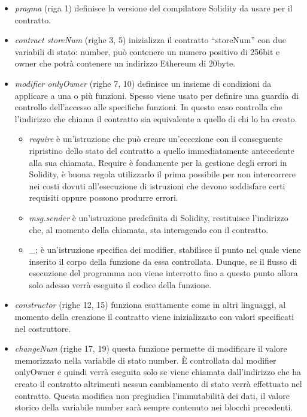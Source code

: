 \renewcommand\labelitemii{\textbullet}
\begin{itemize}
\item \emph{pragma} (riga 1) definisce la versione del compilatore Solidity da usare per il contratto.
\item \emph{contract storeNum} (righe 3, 5) inizializza il contratto “storeNum” con due variabili di stato: number, può contenere un numero positivo di 256bit e owner che potrà contenere un indirizzo Ethereum di 20byte.
\item \emph{modifier onlyOwner} (righe 7, 10) definisce un insieme di condizioni da applicare a una o più funzioni. Spesso viene usato per definire una guardia di controllo dell'accesso alle specifiche funzioni. In questo caso controlla che l'indirizzo che chiama il contratto sia equivalente a quello di chi lo ha creato.
    \begin{itemize}
        \item \emph{require} è un'istruzione che può creare un'eccezione con il conseguente ripristino dello stato del contratto a quello immediatamente antecedente alla sua chiamata. Require è fondamente per la gestione degli errori in Solidity, è buona regola utilizzarlo il prima possibile per non intercorrere nei costi dovuti all'esecuzione di istruzioni che devono soddisfare certi requisiti oppure possono produrre errori. 
        \item \emph{msg.sender} è un'istruzione predefinita di Solidity, restituisce l'indirizzo che, al momento della chiamata, sta interagendo con il contratto.
        \item {\_}; è un'istruzione specifica dei modifier, stabilisce il punto nel quale viene inserito il corpo della funzione da essa controllata. Dunque, se il flusso di esecuzione del programma non viene interrotto fino a questo punto allora solo adesso verrà eseguito il codice della funzione.
    \end{itemize}
\item \emph{constructor} (righe 12, 15) funziona esattamente come in altri linguaggi, al momento della creazione il contratto viene inizializzato con valori specificati nel costruttore.
\item \emph{changeNum} (righe 17, 19) questa funzione permette di modificare il valore memorizzato nella variabile di stato number. È controllata dal modifier onlyOwner e quindi verrà eseguita solo se viene chiamata dall’indirizzo che ha creato il contratto altrimenti nessun cambiamento di stato verrà effettuato nel contratto. Questa modifica non pregiudica l'immutabilità dei dati, il valore storico della variabile number sarà sempre contenuto nei blocchi precedenti.
\end{itemize}

